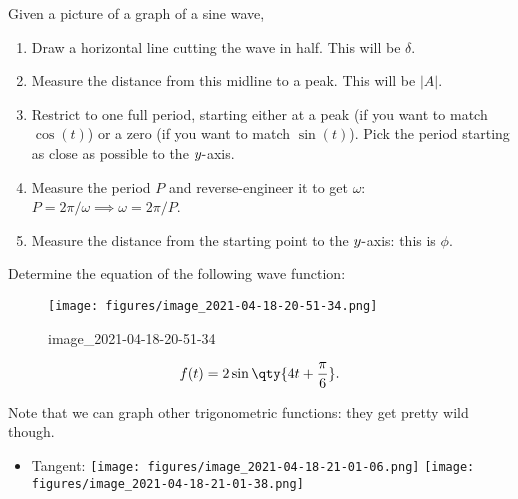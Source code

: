 \begin{proposition}

Given a picture of a graph of a sine wave,

\begin{enumerate}
\def\labelenumi{\arabic{enumi}.}
\tightlist
\item
  Draw a horizontal line cutting the wave in half. This will be
  \(\delta\).
\item
  Measure the distance from this midline to a peak. This will be
  \({\left\lvert {A} \right\rvert}\).
\item
  Restrict to one full period, starting either at a peak (if you want to
  match \(\cos(t)\)) or a zero (if you want to match \(\sin(t)\)). Pick
  the period starting as close as possible to the \(y{\hbox{-}}\)axis.
\item
  Measure the period \(P\) and reverse-engineer it to get \(\omega\):
  \(P = 2\pi/\omega \implies \omega = 2\pi/P\).
\item
  Measure the distance from the starting point to the
  \(y{\hbox{-}}\)axis: this is \(\phi\).
\end{enumerate}

\end{proposition}

\begin{example}[?]

Determine the equation of the following wave function:

\begin{figure}
\centering
\texttt{[image: figures/image\_2021-04-18-20-51-34.png]}
\caption{image\_2021-04-18-20-51-34}
\end{figure}

\begin{solution}

\begin{align*}
f(t) = 2\sin\qty{4t + {\pi \over 6} }
.\end{align*}

\end{solution}

\end{example}

\begin{remark}

Note that we can graph other trigonometric functions: they get pretty
wild though.

\begin{itemize}
\tightlist
\item
  Tangent: \texttt{[image: figures/image\_2021-04-18-21-01-06.png]}
  \texttt{[image: figures/image\_2021-04-18-21-01-38.png]}
\end{itemize}

\end{remark}

